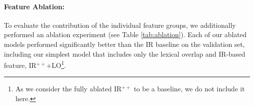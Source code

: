 \paragraph{Feature Ablation:} To evaluate the contribution of the individual feature groups, we additionally performed an ablation experiment (see Table \ref{tab:ablation}).
Each of our ablated models performed significantly better than the IR baseline on the validation set, including our simplest model that includes only the lexical overlap and IR-based feature, IR$^{++}$+LO\footnote{As we consider the fully ablated IR$^{++}$ to be a baseline, we do not include it here.}.
   


